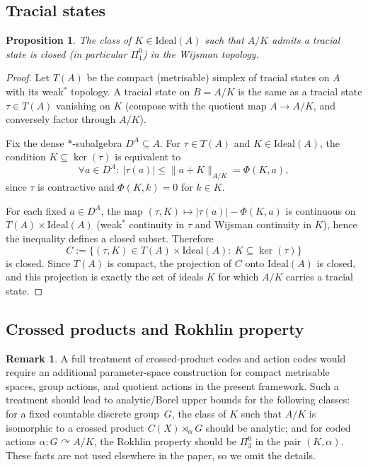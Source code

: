 \documentclass[12pt,fleqn,a4paper]{amsart}
\renewcommand{\le}{\leqslant}
\numberwithin{equation}{section}
\newtheorem{proposition}[theorem]{Proposition}
\theoremstyle{definition}
\newtheorem{remark}[theorem]{Remark}
\newcommand{\Ideal}{\mathrm{Ideal}}
\begin{document}
\subsection{Tracial states}

\begin{proposition}\label{prop:trace}
The class of $K\in\Ideal(A)$ such that $A/K$ admits a tracial state is closed
(in particular $\Pi^0_1$) in the Wijsman topology.
\end{proposition}

\begin{proof}
Let $T(A)$ be the compact (metrisable) simplex of tracial states on $A$
with its weak$^*$ topology.
A tracial state on $B=A/K$ is the same as a tracial state $\tau\in T(A)$
vanishing on $K$ (compose with the quotient map $A\to A/K$, and conversely factor
through $A/K$).

Fix the dense $*$-subalgebra $D^A\subseteq A$.
For $\tau\in T(A)$ and $K\in\Ideal(A)$, the condition $K\subseteq\ker(\tau)$ is
equivalent to
\[
\forall a\in D^A:\ |\tau(a)|\le \|a+K\|_{A/K}=\Phi(K,a),
\]
since $\tau$ is contractive and $\Phi(K,k)=0$ for $k\in K$.

For each fixed $a\in D^A$, the map $(\tau,K)\mapsto |\tau(a)|-\Phi(K,a)$ is continuous
on $T(A)\times\Ideal(A)$ (weak$^*$ continuity in $\tau$ and Wijsman continuity in $K$),
hence the inequality defines a closed subset.
Therefore
\[
C:=\{(\tau,K)\in T(A)\times\Ideal(A):\ K\subseteq\ker(\tau)\}
\]
is closed.
Since $T(A)$ is compact, the projection of $C$ onto $\Ideal(A)$ is closed, and this
projection is exactly the set of ideals $K$ for which $A/K$ carries a tracial state.
\end{proof}

\subsection{Crossed products and Rokhlin property}

\begin{remark}\label{rem:crossed-Rokhlin}
A full treatment of crossed-product codes and action codes would require an
additional parameter-space construction for compact metrisable spaces, group
actions, and quotient actions in the present framework.
Such a treatment should lead to analytic/Borel upper bounds for the following classes:
for a fixed countable discrete group~$G$, the class of $K$ such that $A/K$ is
isomorphic to a crossed product $C(X)\rtimes_\alpha G$ should be analytic;
and for coded actions $\alpha:G\curvearrowright A/K$, the Rokhlin property should
be $\Pi^0_3$ in the pair $(K,\alpha)$.
These facts are not used elsewhere in the paper, so we omit the details.
\end{remark}
\end{document}

